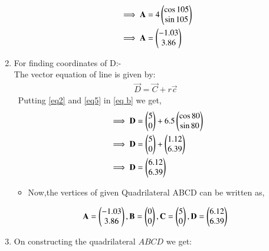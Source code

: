 \documentclass[journal,12pt,twocolumn]{IEEEtran}
\begin{document}
\begin{enumerate}
\begin{align}
&\implies \mathbf{A}=4\begin{pmatrix}\cos 105 \\\sin 105 \end{pmatrix}
\\
&\implies \mathbf{A}=\begin{pmatrix}-1.03\\3.86\end{pmatrix}
\end{align}
\item For finding coordinates of D:-
\\
The vector equation of line is given by:
\begin{align}
\vec{D}=\vec{C} + r \vec{c}
\end{align}
\ Putting \eqref{eq2} and \eqref{eq5} in \eqref{eq b} we get,
\begin{align}
&\implies \mathbf{D}=\begin{pmatrix}5\\0\end{pmatrix} + 6.5\begin{pmatrix}\cos 80 \\\sin 80 \end{pmatrix}
\\
&\implies \mathbf{D}=\begin{pmatrix}5\\0\end{pmatrix} + \begin{pmatrix}1.12\\6.39\end{pmatrix}
\\
&\implies \mathbf{D}=\begin{pmatrix}6.12\\6.39\end{pmatrix}
\end{align}
\begin{itemize}
\item Now,the vertices of given Quadrilateral ABCD can be written as,
\end{itemize}
\begin{align}
 \mathbf{A}=\begin{pmatrix}-1.03\\3.86\end{pmatrix},\mathbf{B} = \begin{pmatrix}0\\0\end{pmatrix}, \mathbf{C}=\begin{pmatrix}5\\0\end{pmatrix},\mathbf{D}=\begin{pmatrix}6.12\\6.39\end{pmatrix}
\end{align}
    \item On constructing the quadrilateral $ABCD$ we get:
\end{enumerate}   
\end{document}
